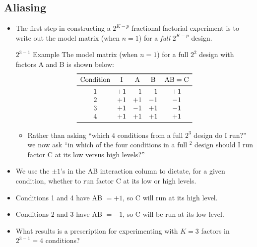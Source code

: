 \subsection{Aliasing}
\begin{itemize}
    \item The first step in constructing a $ 2^{K-p} $ fractional factorial experiment is to
          write out the model matrix (when $ n=1 $) for a \emph{full} $ 2^{K-p} $ design.
          \begin{Example}{$ 2^{3-1} $ Example}{}
              The model matrix (when $ n=1 $) for a full $ 2^2 $ design with factors A and B is shown below:
              \[ \begin{array}{ccccc}
                      \toprule
                      \text{Condition} & \text{I} & \text{A} & \text{B} & \text{AB}=\text{C} \\
                      \midrule
                      1                & +1       & -1       & -1       & +1                 \\
                      2                & +1       & +1       & -1       & -1                 \\
                      3                & +1       & -1       & +1       & -1                 \\
                      4                & +1       & +1       & +1       & +1                 \\
                      \bottomrule
                  \end{array} \]
          \end{Example}
          \begin{itemize}
              \item Rather than asking ``which $4$ conditions from a full $2^3$ design do I run?'' we now ask ``in which
                    of the four conditions in a full $^2$ design should I run factor C at its low versus high levels?''
          \end{itemize}
    \item We use the $ \pm 1 $'s in the AB interaction column to dictate, for a given condition, whether to run factor
          C at its low or high levels.
    \item Conditions 1 and 4 have AB $ =+1 $, so C will run at its high level.
    \item Conditions 2 and 3 have AB $ =-1 $, so C will be run at its low level.
    \item What results is a prescription for experimenting with $K = 3$ factors in $ 2^{3-1}=4 $ conditions?

\end{itemize}
